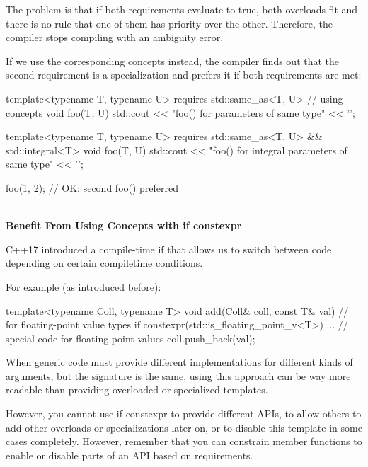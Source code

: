 The problem is that if both requirements evaluate to true, both overloads fit and there is no rule that one of them has priority over the other. Therefore, the compiler stops compiling with an ambiguity error.

If we use the corresponding concepts instead, the compiler finds out that the second requirement is a specialization and prefers it if both requirements are met:

\begin{cpp}
template<typename T, typename U>
requires std::same_as<T, U> // using concepts
void foo(T, U)
{
	std::cout << "foo() for parameters of same type" << '\n';
}

template<typename T, typename U>
requires std::same_as<T, U> && std::integral<T>
void foo(T, U)
{
	std::cout << "foo() for integral parameters of same type" << '\n';
}

foo(1, 2); // OK: second foo() preferred
\end{cpp}

\noindent
\hspace*{\fill} \\ %
\textbf{Benefit From Using Concepts with if constexpr}

C++17 introduced a compile-time if that allows us to switch between code depending on certain compiletime conditions.

For example (as introduced before):

\begin{cpp}
template<typename Coll, typename T>
void add(Coll& coll, const T& val) // for floating-point value types
{
	if constexpr(std::is_floating_point_v<T>) {
		... // special code for floating-point values
	}
	coll.push_back(val);
}
\end{cpp}

When generic code must provide different implementations for different kinds of arguments, but the signature is the same, using this approach can be way more readable than providing overloaded or specialized templates.

However, you cannot use if constexpr to provide different APIs, to allow others to add other overloads or specializations later on, or to disable this template in some cases completely. However, remember that you can constrain member functions to enable or disable parts of an API based on requirements.








